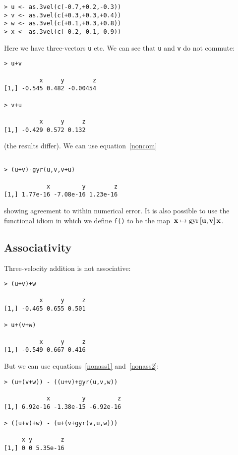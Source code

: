 \documentclass[ijoc,nonblindrev]{informs3} %
\begin{document}
\begin{verbatim}
> u <- as.3vel(c(-0.7,+0.2,-0.3))
> v <- as.3vel(c(+0.3,+0.3,+0.4))
> w <- as.3vel(c(+0.1,+0.3,+0.8))
> x <- as.3vel(c(-0.2,-0.1,-0.9))

\end{verbatim}

Here we have three-vectors {\tt u} etc.  We can see that {\tt u} and
{\tt v} do not commute:

\begin{verbatim}
> u+v

          x     y        z
[1,] -0.545 0.482 -0.00454

> v+u

          x     y     z
[1,] -0.429 0.572 0.132

\end{verbatim}

(the results differ).  We can use equation~\ref{noncom}

\begin{verbatim}

> (u+v)-gyr(u,v,v+u)

            x         y        z 
[1,] 1.77e-16 -7.08e-16 1.23e-16

\end{verbatim}

showing agreement to within numerical error.  It is also possible to
use the functional idiom in which we define {\tt f()} to be the
map~$\mathbf x\mapsto\operatorname{gyr}\left[{\mathbf u},{\mathbf v}\right]\mathbf x$.

\subsection{Associativity}

Three-velocity addition is not associative:

\begin{verbatim}
> (u+v)+w

          x     y     z
[1,] -0.465 0.655 0.501

> u+(v+w)

          x     y     z 
[1,] -0.549 0.667 0.416

\end{verbatim}

But we can use equations~\ref{nonass1} and~\ref{nonass2}:

\begin{verbatim}
> (u+(v+w)) - ((u+v)+gyr(u,v,w))

            x         y         z
[1,] 6.92e-16 -1.38e-15 -6.92e-16

> ((u+v)+w) - (u+(v+gyr(v,u,w)))

     x y        z
[1,] 0 0 5.35e-16

\end{verbatim}
\end{document}
